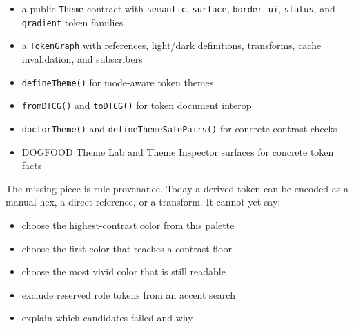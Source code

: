 \begin{itemize}
\tightlist
\item
  a public \texttt{T\allowbreak{}h\allowbreak{}e\allowbreak{}m\allowbreak{}e} contract with \texttt{s\allowbreak{}e\allowbreak{}m\allowbreak{}a\allowbreak{}n\allowbreak{}t\allowbreak{}i\allowbreak{}c}, \texttt{s\allowbreak{}u\allowbreak{}r\allowbreak{}f\allowbreak{}a\allowbreak{}c\allowbreak{}e}, \texttt{b\allowbreak{}o\allowbreak{}r\allowbreak{}d\allowbreak{}e\allowbreak{}r}, \texttt{u\allowbreak{}i}, \texttt{s\allowbreak{}t\allowbreak{}a\allowbreak{}t\allowbreak{}u\allowbreak{}s}, and \texttt{g\allowbreak{}r\allowbreak{}a\allowbreak{}d\allowbreak{}i\allowbreak{}e\allowbreak{}n\allowbreak{}t} token families
\item
  a \texttt{T\allowbreak{}o\allowbreak{}k\allowbreak{}e\allowbreak{}n\allowbreak{}G\allowbreak{}r\allowbreak{}a\allowbreak{}p\allowbreak{}h} with references, light/dark definitions, transforms, cache invalidation, and subscribers
\item
  \texttt{d\allowbreak{}e\allowbreak{}f\allowbreak{}i\allowbreak{}n\allowbreak{}e\allowbreak{}T\allowbreak{}h\allowbreak{}e\allowbreak{}m\allowbreak{}e\allowbreak{}(\allowbreak{})} for mode-aware token themes
\item
  \texttt{f\allowbreak{}r\allowbreak{}o\allowbreak{}m\allowbreak{}D\allowbreak{}T\allowbreak{}C\allowbreak{}G\allowbreak{}(\allowbreak{})} and \texttt{t\allowbreak{}o\allowbreak{}D\allowbreak{}T\allowbreak{}C\allowbreak{}G\allowbreak{}(\allowbreak{})} for token document interop
\item
  \texttt{d\allowbreak{}o\allowbreak{}c\allowbreak{}t\allowbreak{}o\allowbreak{}r\allowbreak{}T\allowbreak{}h\allowbreak{}e\allowbreak{}m\allowbreak{}e\allowbreak{}(\allowbreak{})} and \texttt{d\allowbreak{}e\allowbreak{}f\allowbreak{}i\allowbreak{}n\allowbreak{}e\allowbreak{}T\allowbreak{}h\allowbreak{}e\allowbreak{}m\allowbreak{}e\allowbreak{}S\allowbreak{}a\allowbreak{}f\allowbreak{}e\allowbreak{}P\allowbreak{}a\allowbreak{}i\allowbreak{}r\allowbreak{}s\allowbreak{}(\allowbreak{})} for concrete contrast checks
\item
  DOGFOOD Theme Lab and Theme Inspector surfaces for concrete token facts
\end{itemize}

The missing piece is rule provenance. Today a derived token can be encoded as a manual hex, a direct reference, or a transform. It cannot yet say:

\begin{itemize}
\tightlist
\item
  choose the highest-contrast color from this palette
\item
  choose the first color that reaches a contrast floor
\item
  choose the most vivid color that is still readable
\item
  exclude reserved role tokens from an accent search
\item
  explain which candidates failed and why
\end{itemize}

